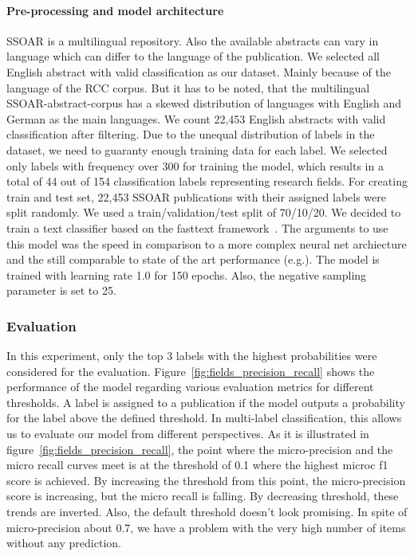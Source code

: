 \paragraph{Pre-processing and model architecture}
SSOAR is a multilingual repository.
Also the available abstracts can vary in language which can differ to the language of the publication.
We selected all English abstract with valid classification as our dataset.
Mainly because of the language of the RCC corpus.
But it has to be noted, that the multilingual SSOAR-abstract-corpus has a skewed distribution of languages with English and German as the main languages.
We count 22,453 English abstracts with valid classification after filtering.
Due to the unequal distribution of labels in the dataset, we need to guaranty enough training data for each label.
We selected only labels with frequency over 300 for training the model, which results in a total of 44 out of 154 classification labels representing research fields.
For creating train and test set, 22,453 SSOAR publications with their assigned labels were split randomly.
We used a train/validation/test split of 70/10/20.
We decided to train a text classifier based on the fasttext framework~\cite{joulin2017bag}.
The arguments to use this model was the speed in comparison to a more complex neural net archiecture and the still comparable to state of the art performance (e.g.\cite{wang2018joint}).
The model is trained with learning rate 1.0 for 150 epochs.
Also, the negative sampling parameter is set to 25.


\subsubsection{Evaluation}
In this experiment, only the top 3 labels with the highest probabilities were considered for the evaluation.
Figure~\ref{fig:fields_precision_recall} shows the performance of the model regarding various evaluation metrics for different thresholds. 
A label is assigned to a publication if the model outputs a probability for the label above the defined threshold.
In multi-label classification, this allows us to evaluate our model from different perspectives. 
As it is illustrated in figure~\ref{fig:fields_precision_recall}, the point where the micro-precision and the micro recall curves meet is at the threshold of 0.1 where the highest microc f1 score is achieved.
By increasing the threshold from this point, the micro-precision score is increasing, but the micro recall is falling. By decreasing threshold, these trends are inverted.  Also, the default threshold doesn't look promising. In spite of micro-precision about 0.7, we have a problem with the very high number of items without any prediction. 

